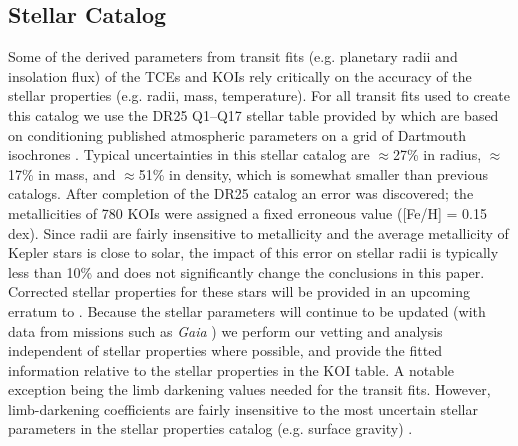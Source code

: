 \subsection{Stellar Catalog}
\label{s:stars}
Some of the derived parameters from transit fits (e.g. planetary radii and insolation flux) of the TCEs and KOIs rely critically on the accuracy of the stellar properties (e.g. radii, mass, temperature).   For all transit fits used to create this catalog we use the DR25 Q1--Q17 stellar table provided by \citet{Mathur2017ApJS} which are based on conditioning published atmospheric parameters on a grid of Dartmouth isochrones \citep{Dotter2008}.  Typical uncertainties in this stellar catalog are $\approx$27\% in radius, $\approx$17\% in mass, and $\approx$51\% in density, which is somewhat smaller than previous catalogs. 
{\color{blue}After completion of the DR25 catalog an error was discovered; the metallicities of 780 KOIs were assigned a fixed erroneous value ([Fe/H] = 0.15 dex). Since radii are fairly insensitive to metallicity and the average metallicity of Kepler stars is close to solar, the impact of this error on stellar radii is typically less than 10\% and does not significantly change the conclusions in this paper. Corrected stellar properties for these stars will be provided in an upcoming erratum to \citet{Mathur2017ApJS}. Because the stellar parameters will continue to be updated (with data from missions such as \emph{Gaia} \citep{gaia1,gaia2}) we perform our vetting and analysis independent of stellar properties where possible, and provide the fitted information relative to the stellar properties in the KOI table.  A notable exception being the limb darkening values needed for the transit fits. However, limb-darkening coefficients are fairly insensitive to the most uncertain stellar parameters in the stellar properties catalog (e.g. surface gravity) \citep{Claret2000}.}